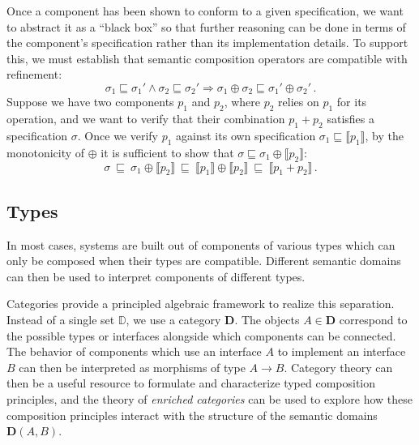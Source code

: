 \documentclass[draft,11pt]{report}
\theoremstyle{definition}
\newcommand{\refby}{\sqsubseteq} %
\begin{document}
Once a component has been shown to conform to a given specification,
we want to abstract it as a ``black box''
so that further reasoning can be done in terms of
the component's specification rather than its implementation details.
To support this,
we must establish that semantic composition operators
are compatible with refinement:
\[ \sigma_1 \refby \sigma_1' \wedge
   \sigma_2 \refby \sigma_2' \Rightarrow
   \sigma_1 \oplus \sigma_2 \refby \sigma_1' \oplus \sigma_2' \,. \]
Suppose we have two components $p_1$ and $p_2$,
where $p_2$ relies on $p_1$ for its operation,
and we want to verify that their combination $p_1 + p_2$
satisfies a specification $\sigma$.
Once we verify $p_1$ against its own specification
$\sigma_1 \refby \llbracket p_1 \rrbracket$,
by the monotonicity of ${\oplus}$ it is sufficient to show that
$\sigma \refby \sigma_1 \oplus \llbracket p_2 \rrbracket$:
\[
   \sigma \:\refby\:
   \sigma_1 \oplus \llbracket p_2 \rrbracket \:\refby\:
   \llbracket p_1 \rrbracket \oplus \llbracket p_2 \rrbracket \:\refby\:
   \llbracket p_1 + p_2 \rrbracket \,.
\]


\subsection{Types} %

In most cases,
systems are built out of components of various types
which can only be composed when their types are compatible.
Different semantic domains can then be used
to interpret components of different types.

Categories provide a principled algebraic framework
to realize this separation.
Instead of a single set $\mathbb{D}$,
we use a category $\mathbf{D}$.
The objects $A \in \mathbf{D}$ correspond to
the possible types or interfaces alongside which
components can be connected.
The behavior of components which
use an interface $A$ to
implement an interface $B$
can then be interpreted as morphisms
of type $A \rightarrow B$.
Category theory can then be a useful resource
to formulate and characterize typed composition principles,
and the theory of \emph{enriched categories}
can be used to explore how these composition principles
interact with the structure of the semantic domains
$\mathbf{D}(A, B)$.
\end{document}

